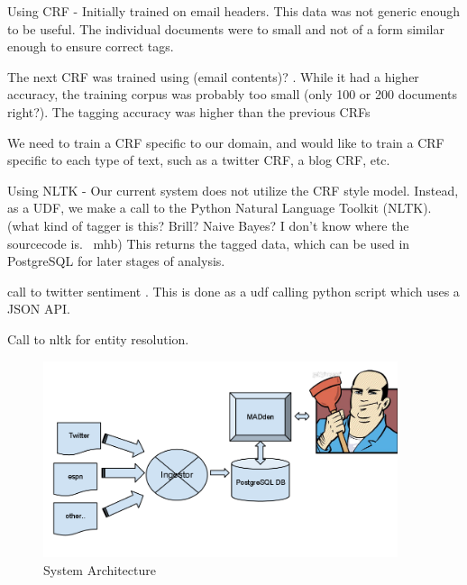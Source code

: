 \documentclass{article}
\begin{document}
\begin{enumerate}
\begin{enumerate}
\begin{enumerate}
      Using CRF -
      Initially trained on email headers.
      This data was not generic enough to be useful.
      The individual documents were to small and not of a form similar enough to ensure correct tags.

      The next CRF was trained using (email contents)? .
      While it had a higher accuracy, the training corpus was probably too small (only 100 or 200 documents right?).
      The tagging accuracy was higher than the previous CRFs

      We need to train a CRF specific to our domain,
      and would like to train a CRF specific to each type of text,
      such as a twitter CRF, a blog CRF, etc.

      Using NLTK -
      Our current system does not utilize the CRF style model.
      Instead, as a UDF, we make a call to the Python Natural Language Toolkit (NLTK).
      (what kind of tagger is this? Brill? Naive Bayes? I don't know where the sourcecode is. ~mhb)
      This returns the tagged data, which can be used in PostgreSQL for later stages of analysis.


    \end{enumerate}






    call to twitter sentiment . This is done as a udf calling python script which uses a JSON API.

    Call to nltk for entity resolution.

    \begin{figure}
      \begin{center}
        \includegraphics[width=104mm]{architecture-1.png}
        \caption{System Architecture}
        \label{fig:architecture}
      \end{center}
    \end{figure}


\end{enumerate}
\end{enumerate}
\end{document}

